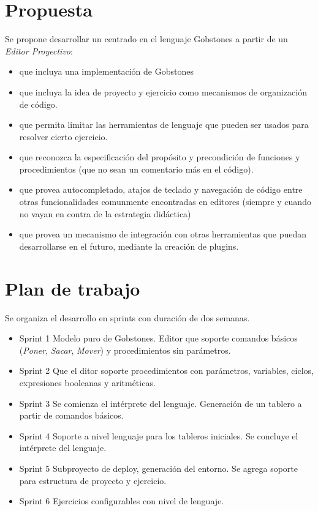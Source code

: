 \section{Propuesta}

Se propone desarrollar un \ile centrado en el lenguaje Gobstones a partir de un \textit{Editor Proyectivo}:

\begin{itemize}
  \item que incluya una implementación de Gobstones
  \item que incluya la idea de proyecto y ejercicio como mecanismos de organización de código.
  \item que permita limitar las herramientas de lenguaje que pueden ser usados para resolver cierto ejercicio.
  \item que reconozca la especificación del propósito y precondición de funciones y procedimientos (que no sean un comentario más en el código).
  \item que provea autocompletado, atajos de teclado y navegación de código entre otras funcionalidades comunmente encontradas en editores (siempre y cuando no vayan en contra de la estrategia didáctica)
  \item que provea un mecanismo de integración con otras herramientas que puedan desarrollarse en el futuro, mediante la creación de plugins.
\end{itemize}


\section{Plan de trabajo}

Se organiza el desarrollo en sprints con duración de dos semanas.

\begin{itemize}
  \item{Sprint 1} Modelo puro de Gobstones. Editor que soporte comandos básicos (\textit{Poner}, \textit{Sacar}, \textit{Mover}) y procedimientos sin parámetros.
  \item{Sprint 2} Que el ditor soporte procedimientos con parámetros, variables, ciclos, expresiones booleanas y aritméticas.
  \item{Sprint 3} Se comienza el intérprete del lenguaje. Generación de un tablero a partir de comandos básicos.
  \item{Sprint 4} Soporte a nivel lenguaje para los tableros iniciales. Se concluye el intérprete del lenguaje. 
  \item{Sprint 5} Subproyecto de deploy, generación del entorno. Se agrega soporte para estructura de proyecto y ejercicio.
  \item{Sprint 6} Ejercicios configurables con nivel de lenguaje.
\end{itemize} 


